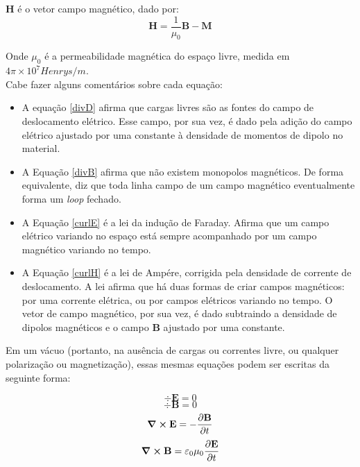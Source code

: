 \documentclass[12pt,a4paper]{report}
\begin{document}
$\textbf{H}$ é o vetor campo magnético, dado por:
\begin{equation}
    \textbf{H}=\frac{1}{\mu_0}\textbf{B}-\textbf{M}
\end{equation}

Onde $\mu_0$ é a permeabilidade magnética do espaço livre, medida em $4\pi \times 10^7 Henrys/m$.\\

Cabe fazer alguns comentários sobre cada equação:
\begin{itemize}
    \item A equação \ref{divD} afirma que cargas livres são as fontes do campo de deslocamento elétrico. Esse campo, por sua vez, é dado pela adição do campo elétrico ajustado por uma constante à densidade de momentos de dipolo no material.
    \item A Equação \ref{divB} afirma que não existem monopolos magnéticos. De forma equivalente, diz que toda linha campo de um campo magnético eventualmente forma um \textit{loop} fechado.
    \item A Equação \ref{curlE} é a lei da indução de Faraday. Afirma que um campo elétrico variando no espaço está sempre acompanhado por um campo magnético variando no tempo.
    \item A Equação \ref{curlH} é a lei de Ampére, corrigida pela densidade de corrente de deslocamento. A lei afirma que há duas formas de criar campos magnéticos: por uma corrente elétrica, ou por campos elétricos variando no tempo. O vetor de campo magnético, por sua vez, é dado subtraindo a densidade de dipolos magnéticos e o campo \textbf{B} ajustado por uma constante.
\end{itemize}

Em um vácuo (portanto, na ausência de cargas ou correntes livre, ou qualquer polarização ou magnetização), essas mesmas equações podem ser escritas da seguinte forma:

\begin{equation}
    \div{\textbf{E}}=0
    \label{divEvac}
\end{equation}
\begin{equation}
    \div{\textbf{B}}=0
\end{equation}
\begin{equation}
    \curl{\textbf{E}}=-\frac{\partial\textbf{B}}{\partial t}
    \label{curlEvac}
\end{equation}
\begin{equation}
    \curl{\textbf{B}}=\varepsilon_0\mu_0\frac{\partial\textbf{E}}{\partial t}
    \label{curlBvac}
\end{equation}
\end{document}
